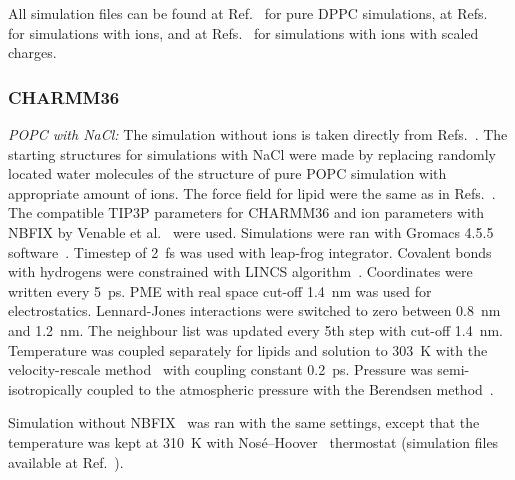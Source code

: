 \documentclass[twoside,twocolumn,9pt]{article}
\begin{document}
All simulation files can be found at Ref.~ for pure DPPC simulations, 
at Refs.~ for simulations with ions,
and at Refs.~ for simulations with ions with scaled charges. 



\subsubsection{CHARMM36}
{\it POPC with NaCl:}
The simulation without ions is taken directly from Refs.~. 
The starting structures for simulations with NaCl were made by replacing randomly located 
water molecules of the structure of pure POPC simulation with appropriate amount of ions.
The force field for lipid were the same as in Refs.~.
The compatible TIP3P parameters for CHARMM36 and ion parameters with NBFIX by Venable et al.~\cite{venable13} were used.
Simulations were ran with Gromacs 4.5.5 software~\cite{pronk13}.
Timestep of 2~fs was used with leap-frog integrator. Covalent bonds with hydrogens were constrained with LINCS algorithm~\cite{hess97,hess07}. 
Coordinates were written every 5~ps. PME with real space cut-off 1.4~nm was used 
for electrostatics. Lennard-Jones interactions were switched to zero between 0.8~nm and 1.2~nm.
The neighbour list was updated every 5th step with cut-off 1.4~nm. Temperature was coupled separately
for lipids and solution to 303~K with the velocity-rescale method~\cite{bussi07} with coupling constant 0.2~ps.
Pressure was semi-isotropically coupled to the atmospheric pressure with the Berendsen method~\cite{berendsen84}.

Simulation without NBFIX~\cite{venable13} was ran with the same settings, except that 
the temperature was kept at 310~K with Nos{\'e}--Hoover~\cite{nose84,hoover85} thermostat 
(simulation files available at Ref.~). 
\end{document}
